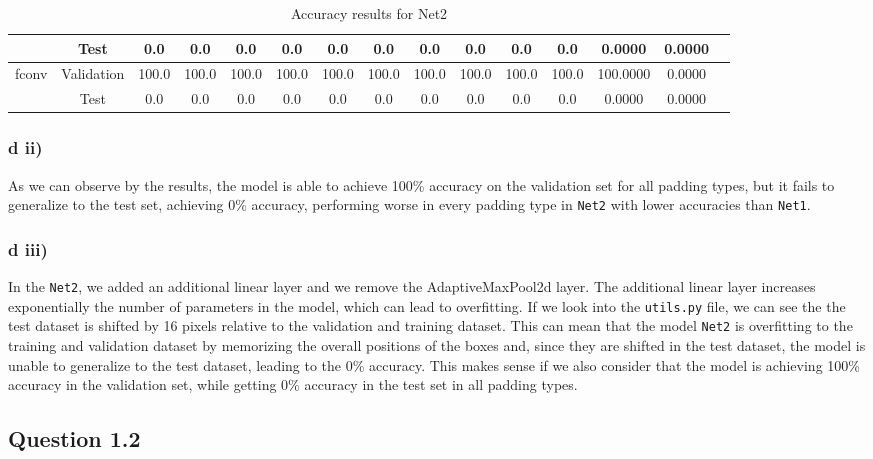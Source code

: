\documentclass{article}
\begin{document}
\begin{table}[h!]
{\begin{tabular}{|c|c|c|c|c|c|c|c|c|c|c|c|c|c|c|}
                               & Test       & 0.0   & 0.0   & 0.0   & 0.0   & 0.0   & 0.0   & 0.0   & 0.0   & 0.0   & 0.0   & 0.0000   & 0.0000 \\ \hline
    \multirow{2}{*}{fconv}     & Validation & 100.0 & 100.0 & 100.0 & 100.0 & 100.0 & 100.0 & 100.0 & 100.0 & 100.0 & 100.0 & 100.0000 & 0.0000 \\ \cline{2-14}
                               & Test       & 0.0   & 0.0   & 0.0   & 0.0   & 0.0   & 0.0   & 0.0   & 0.0   & 0.0   & 0.0   & 0.0000   & 0.0000 \\ \hline
    \end{tabular}
    }
    \caption{Accuracy results for Net2}
    \label{tab:results_accuracy_net2}
\end{table}

\subsubsection*{d ii)}

As we can observe by the results, the model is able to achieve 100\% accuracy on the validation set for all padding types, 
but it fails to generalize to the test set, achieving 0\% accuracy, performing worse in every padding type in \texttt{Net2}
with lower accuracies than \texttt{Net1}.

\subsubsection*{d iii)}

In the \texttt{Net2}, we added an additional linear layer and we remove the AdaptiveMaxPool2d layer. 
The additional linear layer increases exponentially the number of parameters in the model, which can lead to overfitting.
If we look into the \texttt{utils.py} file, we can see the the test dataset is shifted by 16 pixels relative to the validation
and training dataset. This can mean that the model \texttt{Net2} is overfitting to the training and validation dataset
by memorizing the overall positions of the boxes and, since they are shifted in the test dataset, the model is unable to
generalize to the test dataset, leading to the 0\% accuracy. This makes sense if we also consider that the model
is achieving 100\% accuracy in the validation set, while getting 0\% accuracy in the test set in all padding types.

\subsection*{Question 1.2}
\end{document}
